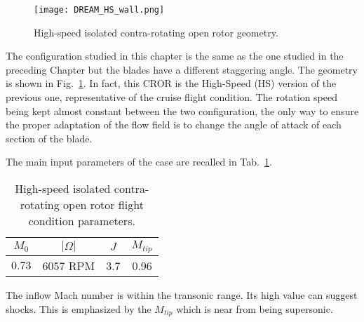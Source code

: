 
\begin{figure}[htp]
  \centering
  \texttt{[image: DREAM\_HS\_wall.png]}
  \caption{High-speed isolated contra-rotating open rotor geometry.}
  \label{fig:dream_hs_wall}
\end{figure}

The configuration studied in this chapter is the same as the
one studied in the preceding Chapter but the blades have a 
different staggering angle. The geometry is shown in Fig.~\ref{fig:dream_hs_wall}.
In fact, this CROR is the High-Speed (HS) version of the previous one, 
representative of the cruise flight condition. The rotation speed being kept
almost constant between the two configuration, the only way to ensure
the proper adaptation of the flow field is to change the angle of 
attack of each section of the blade.

The main input parameters of the case are recalled in
Tab.~\ref{tab:dream_hs_flight_condition}.
\begin{table}[htp]
   \centering
  \begin{tabular}{cccc}
    \toprule
    $M_0$ & $|\Omega|$ & $J$ & $M_{tip}$ \\
    \midrule
    $0.73$ & $6057$ RPM & 3.7 & 0.96  \\
    \bottomrule
  \end{tabular}
  \caption{High-speed isolated contra-rotating open rotor flight condition parameters.}
  \label{tab:dream_hs_flight_condition}
\end{table} 
The inflow Mach number is within the transonic range. Its high value
can suggest shocks. This is emphasized by the $M_{tip}$ which is
near from being supersonic.
